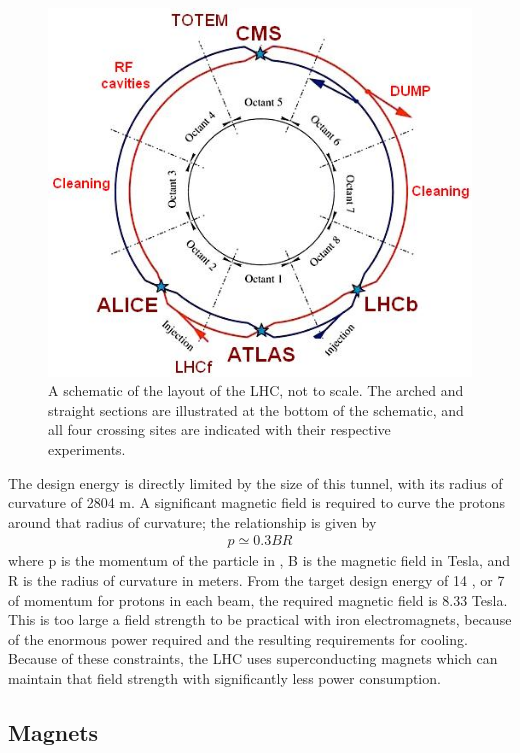 \begin{figure}
\includegraphics[width=\fullfig]{figures/lhc_schematic.jpg}
\caption{A schematic of the layout of the \ac{LHC}, not to scale. The arched and straight sections are illustrated at the bottom of the schematic, and all four crossing sites are indicated with their respective experiments.}
\label{fig:lhc_schematic}
\end{figure}

The design energy is directly limited by the size of this tunnel, with its radius of curvature of 2804 m. 
A significant magnetic field is required to curve the protons around that radius of curvature; the relationship is given by
\begin{align}
p \simeq 0.3BR \label{eq:magnetic_bending}
\end{align}
\noindent where p is the momentum of the particle in \GeV, B is the magnetic field in Tesla, and R is the radius of curvature in meters. 
From the target design energy of 14 \TeV, or 7 \TeV of momentum for protons in each beam, the required magnetic field is 8.33 Tesla.
This is too large a field strength to be practical with iron electromagnets, because of the enormous power required and the resulting requirements for cooling.
Because of these constraints, the \ac{LHC} uses superconducting magnets which can maintain that field strength with significantly less power consumption.

\subsection{Magnets}

